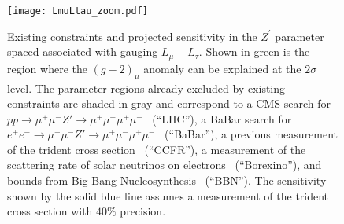\begin{figure}[tb!] \centering
\texttt{[image: LmuLtau\_zoom.pdf]}
\caption[Projected sensitivity to BSM 
contributions to neutrino trident events]{Existing constraints and projected  sensitivity in the $Z^\prime$ parameter spaced associated with gauging $L_\mu - L_\tau$. Shown in green is the region where the $(g-2)_\mu$ anomaly can be explained at the $2\sigma$ level. The parameter regions already excluded by existing constraints are shaded in gray and correspond to 
a CMS search for $pp \to \mu^+\mu^- Z' \to \mu^+\mu^-\mu^+\mu^-$~\cite{Sirunyan:2018nnz} (``LHC''), 
a BaBar search for $e^+e^- \to \mu^+\mu^- Z' \to \mu^+\mu^-\mu^+\mu^-$~\cite{TheBABAR:2016rlg} (``BaBar''), 
a previous measurement of the trident cross section~\cite{Mishra:1991bv,Altmannshofer:2014pba} (``CCFR''), 
a measurement of the scattering rate of solar neutrinos on electrons~\cite{Bellini:2011rx,Harnik:2012ni,Agostini:2017ixy} (``Borexino''), 
and bounds from Big Bang Nucleosynthesis~\cite{Ahlgren:2013wba,Kamada:2015era} (``BBN''). The  sensitivity shown by the solid blue line assumes a measurement of the trident cross section with $40\%$ precision.}
\label{fig:LmuLtau2}
\end{figure}
